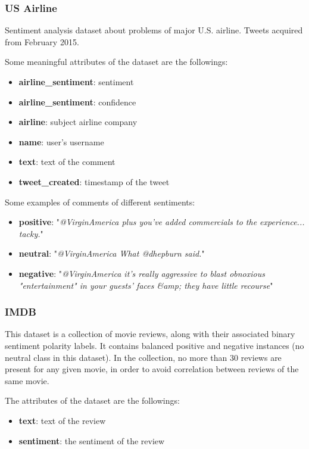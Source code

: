 \subsubsection{US Airline \cite{Rane-TSA-Airline}}
Sentiment analysis dataset about problems of major U.S. airline. Tweets acquired from February 2015.

Some meaningful attributes of the dataset are the followings:
\begin{itemize}
	\item \textbf{airline\_sentiment}: sentiment
	\item \textbf{airline\_sentiment}: confidence
	\item \textbf{airline}: subject airline company
	\item \textbf{name}: user's username
	\item \textbf{text}: text of the comment
	\item \textbf{tweet\_created}: timestamp of the tweet
\end{itemize}

Some examples of comments of different sentiments:
\begin{itemize}
	\item \textbf{positive}: "\textit{@VirginAmerica plus you've added commercials to the experience... tacky.}"
	\item \textbf{neutral}: "\textit{@VirginAmerica What @dhepburn said.}"
	\item \textbf{negative}: "\textit{@VirginAmerica it's really aggressive to blast obnoxious "entertainment" in your guests' faces \&amp; they have little recourse}"
\end{itemize}



\subsubsection{IMDB \cite{maas-EtAl:2011:ACL-HLT2011}}
This dataset is a collection of movie reviews, along with their associated binary sentiment polarity labels. It contains balanced positive and negative instances (no neutral class in this dataset). In the collection, no more than 30 reviews are present for any given movie, in order to avoid correlation between reviews of the same movie.

The attributes of the dataset are the followings:
\begin{itemize}
	\item \textbf{text}: text of the review
	\item \textbf{sentiment}: the sentiment of the review
\end{itemize}

